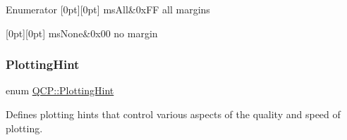 \begin{DoxyEnumFields}{Enumerator}
[0pt][0pt]{}\mbox{\label{namespace_q_c_p_a7e487e3e2ccb62ab7771065bab7cae54a43d7361cb0c5244eabdc962021bffebc}} 
ms\+All&{\ttfamily 0x\+FF} all margins \\
\hline

[0pt][0pt]{}\mbox{\label{namespace_q_c_p_a7e487e3e2ccb62ab7771065bab7cae54a80aa4149f16dabd538f8b2e3d42c42d5}} 
ms\+None&{\ttfamily 0x00} no margin \\
\hline

\end{DoxyEnumFields}
\mbox{\label{namespace_q_c_p_a5400e5fcb9528d92002ddb938c1f4ef4}} 
\subsubsection{\texorpdfstring{Plotting\+Hint}{PlottingHint}}
{\footnotesize\ttfamily enum \hyperlink{namespace_q_c_p_a5400e5fcb9528d92002ddb938c1f4ef4}{Q\+C\+P\+::\+Plotting\+Hint}}

Defines plotting hints that control various aspects of the quality and speed of plotting.


